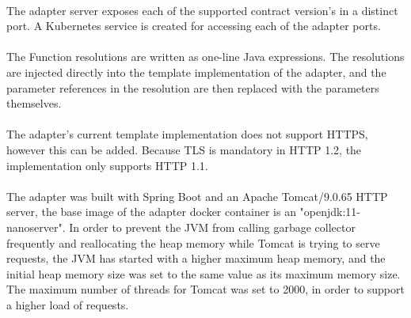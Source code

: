 \paragraph{}

The adapter server exposes each of the supported contract version's in a distinct port.
A Kubernetes service is created for accessing each of the adapter ports.

\paragraph{}

The {\selectfont  Function} resolutions are written as one-line Java expressions.
The resolutions are injected directly into the template implementation of the adapter, and the parameter references in the resolution are then replaced with the parameters themselves.

\paragraph{}

The adapter's current template implementation does not support HTTPS, however this can be added.
Because TLS is mandatory in HTTP 1.2, the implementation only supports HTTP 1.1.

\paragraph{}

The adapter was built with Spring Boot and an Apache Tomcat/9.0.65 HTTP server, the base image of the adapter docker container is an "openjdk:11-nanoserver".
In order to prevent the JVM from calling garbage collector frequently and reallocating the heap memory while Tomcat is trying to serve requests,
the JVM has started with a higher maximum heap memory, and the initial heap memory
size was set to the same value as its maximum memory size.
The maximum number of threads for Tomcat was set to 2000, in order to support a higher load of requests.

